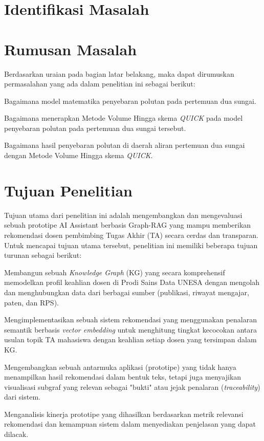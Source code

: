\section{Identifikasi Masalah}



\section{Rumusan Masalah}

Berdasarkan uraian pada bagian latar belakang, maka dapat dirumuskan 
permasalahan yang ada dalam penelitian ini sebagai berikut:

\begin{daftar}
	\item Bagaimana model matematika penyebaran polutan pada pertemuan dua sungai.
	\item Bagaimana menerapkan Metode Volume Hingga skema \textit{QUICK} pada model penyebaran polutan pada pertemuan dua sungai tersebut.
	\item Bagaimana hasil penyebaran polutan di daerah aliran pertemuan dua sungai dengan Metode Volume Hingga skema \textit{QUICK}.
\end{daftar}

\section{Tujuan Penelitian}

Tujuan utama dari penelitian ini adalah mengembangkan dan mengevaluasi sebuah prototipe AI Assistant berbasis Graph-RAG yang mampu memberikan rekomendasi dosen pembimbing Tugas Akhir (TA) secara cerdas dan transparan. Untuk mencapai tujuan utama tersebut, penelitian ini memiliki beberapa tujuan turunan sebagai berikut:

\begin{daftar}
	\item Membangun sebuah \textit{Knowledge Graph} (KG) yang secara komprehensif memodelkan profil keahlian dosen di Prodi Sains Data UNESA dengan mengolah dan menghubungkan data dari berbagai sumber (publikasi, riwayat mengajar, paten, dan RPS).
	\item Mengimplementasikan sebuah sistem rekomendasi yang menggunakan penalaran semantik berbasis \textit{vector embedding} untuk menghitung tingkat kecocokan antara usulan topik TA mahasiswa dengan keahlian setiap dosen yang tersimpan dalam KG.
	\item Mengembangkan sebuah antarmuka aplikasi (prototipe) yang tidak hanya menampilkan hasil rekomendasi dalam bentuk teks, tetapi juga menyajikan visualisasi subgraf yang relevan sebagai "bukti" atau jejak penalaran (\textit{traceability}) dari sistem.
	\item Menganalisis kinerja prototipe yang dihasilkan berdasarkan metrik relevansi rekomendasi dan kemampuan sistem dalam menyediakan penjelasan yang dapat dilacak.
\end{daftar}

